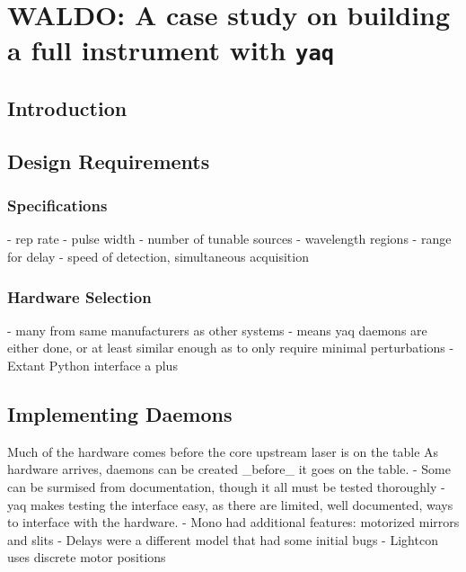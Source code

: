 \chapter{WALDO: A case study on building a full instrument with \texttt{yaq}} \label{cha:waldo}

\clearpage

\section{Introduction}  %

\clearpage

\section{Design Requirements}  %

\subsection{Specifications}

- rep rate
- pulse width
- number of tunable sources
- wavelength regions
- range for delay
- speed of detection, simultaneous acquisition


\subsection{Hardware Selection}

- many from same manufacturers as other systems
   - means yaq daemons are either done, or at least similar enough as to only require minimal perturbations
   - Extant Python interface a plus


\clearpage

\section{Implementing Daemons}  %

Much of the hardware comes before the core upstream laser is on the table
As hardware arrives, daemons can be created _before_ it goes on the table.
   - Some can be surmised from documentation, though it all must be tested thoroughly
   - yaq makes testing the interface easy, as there are limited, well documented, ways to interface with the hardware.
   - Mono had additional features: motorized mirrors and slits
   - Delays were a different model that had some initial bugs
   - Lightcon uses discrete motor positions


